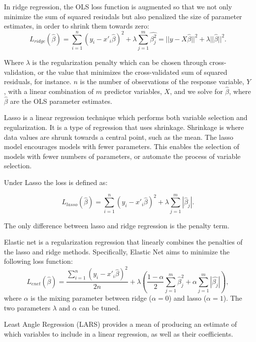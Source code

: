 \documentclass[final,3p,times,twocolumn,numbers]{elsarticle}
\begin{document}
In ridge regression, the OLS loss function is augmented so that we not only minimize the sum of squared resiudals but also penalized the size of parameter estimates, in order to shrink them towards zero:
\begin{equation}
	L_{ridge}(\hat{\beta})=\sum^n_{i=1}(y_i-x'_i\hat{\beta})^2+\lambda\sum^m_{j=1}\hat{\beta^2_j}=||y-X\hat{\beta}||^2+\lambda||\hat{\beta}||^2.
\end{equation}

Where $\lambda$ is the regularization penalty which can be chosen through cross-validation, or the value that minimizes the cross-validated sum of squared residuals, for instance. $n$ is the number of observations of the response variable, $Y$, with a linear combination of $m$ predictor variables, $X$, and we solve for $\hat{\beta}$, where $\hat{\beta}$ are the OLS parameter estimates.



Lasso is a linear regression technique which performs both variable selection and regularization. It is a type of regression that uses shrinkage. Shrinkage is where data values are shrunk towards a central point, such as the mean. The lasso model encourages models with fewer parameters. This enables the selection of models with fewer numbers of parameters, or automate the process of variable selection.

Under Lasso the loss is defined as:

\begin{equation}
	L_{lasso}(\hat{\beta})=\sum^n_{i=1}(y_i-x'_i\hat{\beta})^2+\lambda\sum^m_{j=1}|\hat{\beta}_j|.
\end{equation}

The only difference between lasso and ridge regression is the penalty term.

Elastic net is a regularization regression that linearly combines the penalties of the lasso and ridge methods. Specifically, Elastic Net aims to minimize the following loss function:
\begin{equation}
L_{enet}(\hat{\beta})=\frac{\sum^n_{i=1}(y_i-x'_i\hat{\beta})^2}{2n}+\lambda(\frac{1-\alpha}{2}\sum^m_{j=1}\hat{\beta}^2_j+\alpha\sum^m_{j=1}|\hat{\beta_j}|),
\end{equation}
where $\alpha$ is the mixing parameter between ridge ($\alpha=0$) and lasso ($\alpha=1$). The two parameters $\lambda$ and $\alpha$ can be tuned.


Least Angle Regression (LARS) provides a mean of producing an estimate of which variables to include in a linear regression, as well as their coefficients.
\end{document}
